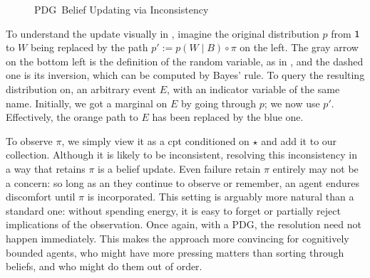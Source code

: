 \documentclass{article}
\newcommand{\MN}{PDG}
\numberwithin{equation}{section}
\begin{document}
\begin{notfocus}
	
	\begin{figure}[h]
		\centering
%				
%				
		\caption{\MN\ Belief Updating via Inconsistency}
		\label{fig:belief-update}
	\end{figure}
	
	To understand the update visually in , imagine the original distribution $p$ from $\sf 1$ to $W$ being replaced by the path $p' := p(W \mid B) \circ \pi$  on the left. The gray arrow on the bottom left is the definition of the random variable, as in , and the dashed one is its inversion, which can be computed by Bayes' rule.  %
	To query the resulting distribution on, an arbitrary event $E$, with an indicator variable of the same name. Initially, we got a marginal on $E$ by going through $p$; we now use $p'$. Effectively, the orange path to $E$ has been replaced by the blue one.

	
	To observe $\pi$, we simply view it as a cpt conditioned on $\star$ and add it to our collection. 
	Although it is likely to be inconsistent, resolving this inconsistency in a way that retains $\pi$ is a belief update. 
	Even failure retain $\pi$ entirely may not be a concern: so long as an they continue to observe or remember, an agent endures discomfort until $\pi$ is incorporated. This setting is arguably more natural than a standard one: without spending energy, it is easy to forget or partially reject implications of the observation.	
	Once again, with a \MN, the resolution need not happen immediately. This makes the approach more convincing for cognitively bounded agents, who might have more pressing matters than sorting through beliefs, and who might do them out of order.


\end{notfocus}
\end{document}
